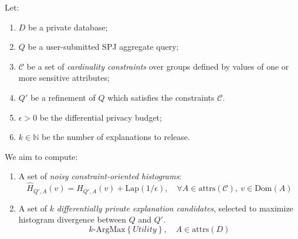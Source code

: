 Let: 

\begin{enumerate}
    \item $D$ be a private database;
    \item $Q$ be a user-submitted SPJ aggregate query;
    \item $\mathcal{C}$ be a set of {\it cardinality constraints} over groups defined by values of one or more sensitive attributes;
    \item $Q'$ be a refinement of $Q$ which satisfies the constraints $\mathcal{C}$.
    \item $\epsilon > 0$ be the differential privacy budget;
    \item $k \in \mathbb{N}$ be the number of explanations to release.
\end{enumerate}


We aim to compute:

\begin{enumerate}
    \item A set of {\it noisy constraint-oriented histograms}:
    $$
    \hat{H}_{Q',A}(v) = H_{Q',A}(v) + \text{Lap}(1/\epsilon), \quad \forall A \in \text{attrs}(\mathcal{C}), \ v \in \text{Dom}(A)
    $$
    \item A set of $k$ {\it differentially private explanation candidates}, selected to maximize histogram divergence between $Q$ and $Q'$.
    $$
    k\text{-ArgMax} \left\{ Utility \right\}, \quad A \in \text{attrs}(D)
    $$
\end{enumerate}
